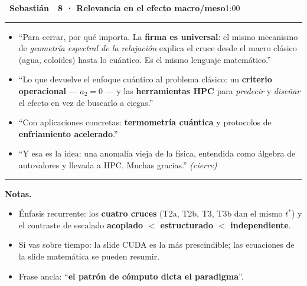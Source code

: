 \documentclass[11pt,a4paper]{article}
\newcommand{\Sb}{\colorbox{seb}{\color{white}\bfseries\footnotesize~Sebastián~}}
\newcommand{\blk}[3]{%
  \par\medskip\noindent #1\ \textbf{#2}\hfill\textcolor{soft}{\small #3}\par
  \vspace{-4pt}\textcolor{soft!40}{\rule{\linewidth}{0.4pt}}\par\vspace{-2pt}}
\begin{document}
\blk{\Sb}{8 · Relevancia en el efecto macro/meso}{1:00}
\begin{itemize}
  \item ``Para cerrar, por qué importa. La \textbf{firma es universal}: el mismo
    mecanismo de \emph{geometría espectral de la relajación} explica el cruce desde el
    macro clásico (agua, coloides) hasta lo cuántico. Es el mismo lenguaje matemático.''
  \item ``Lo que devuelve el enfoque cuántico al problema clásico: un \textbf{criterio
    operacional} --- $a_2=0$ --- y las \textbf{herramientas HPC} para \emph{predecir} y
    \emph{diseñar} el efecto en vez de buscarlo a ciegas.''
  \item ``Con aplicaciones concretas: \textbf{termometría cuántica} y protocolos de
    \textbf{enfriamiento acelerado}.''
  \item ``Y esa es la idea: una anomalía vieja de la física, entendida como álgebra de
    autovalores y llevada a HPC. Muchas gracias.'' \emph{(cierre)}
\end{itemize}

\medskip\hrule\smallskip
\noindent\textbf{\footnotesize Notas.}
\begin{itemize}[font=\footnotesize]\footnotesize
  \item Énfasis recurrente: los \textbf{cuatro cruces} (T2a, T2b, T3, T3b dan el mismo
    $t^*$) y el contraste de escalado \textbf{acoplado $<$ estructurado $<$ independiente}.
  \item Si vas sobre tiempo: la slide CUDA es la más prescindible; las ecuaciones de la
    slide matemática se pueden resumir.
  \item Frase ancla: ``\textbf{el patrón de cómputo dicta el paradigma}''.
\end{itemize}
\end{document}
